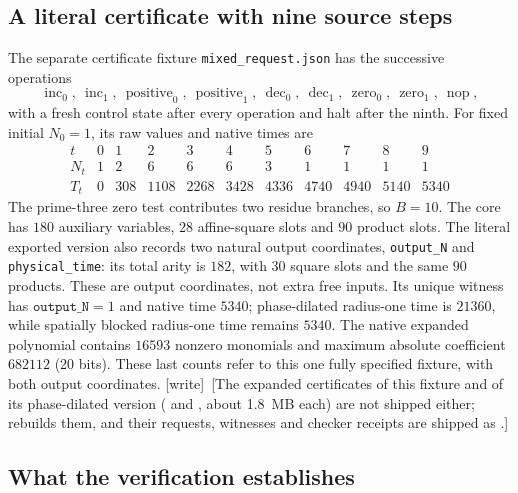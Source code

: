 \documentclass[11pt,letterpaper]{article}
\numberwithin{equation}{section}
\theoremstyle{definition}
\theoremstyle{remark}
\newcommand{\wtag}{\textup{[write]}}
\begin{document}
\subsection{A literal certificate with nine source steps}

The separate certificate fixture \texttt{mixed\_request.json} has the successive operations
\[
\operatorname{inc}_0,\ \operatorname{inc}_1,\
\operatorname{positive}_0,\ \operatorname{positive}_1,\
\operatorname{dec}_0,\ \operatorname{dec}_1,\
\operatorname{zero}_0,\ \operatorname{zero}_1,\ \operatorname{nop},
\]
with a fresh control state after every operation and halt after the ninth.
For fixed initial $N_0=1$, its raw values and native times are
\[
\begin{array}{c|rrrrrrrrrr}
 t&0&1&2&3&4&5&6&7&8&9\\\hline
 N_t&1&2&6&6&6&3&1&1&1&1\\
 T_t&0&308&1108&2268&3428&4336&4740&4940&5140&5340
\end{array}
\]
The prime-three zero test contributes two residue branches, so $B=10$.
The core has $180$ auxiliary variables, $28$ affine-square slots and $90$
product slots. The literal exported version also records two natural output
coordinates, \texttt{output\_N} and \texttt{physical\_time}: its total arity
is $182$, with $30$ square slots and the same $90$ products. These are
output coordinates, not extra free inputs. Its unique witness has
$\texttt{output\_N}=1$ and native time $5340$; phase-dilated radius-one time is $21360$, while spatially blocked radius-one time remains $5340$.
The native expanded polynomial contains $16593$ nonzero monomials and
maximum absolute coefficient $682112$ (20 bits). These last counts refer
to this one fully specified fixture, with both output coordinates.
\wtag\ [The expanded certificates of this fixture and of its phase-dilated version ( and , about 1.8~MB each) are not shipped either;  rebuilds them, and their requests, witnesses and checker receipts are shipped as .]

\subsection{What the verification establishes}
\end{document}
